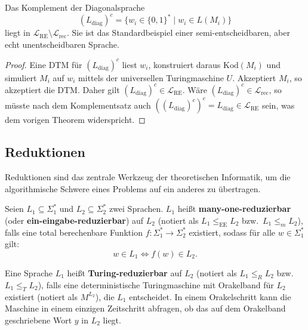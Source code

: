 \begin{theorem}
    Das Komplement der Diagonalsprache
    \[
        (L_{\mathrm{diag}})^c = \{w_i \in \{0, 1\}^* \mid w_i \in L(M_i)\}
    \]
    liegt in $\mathcal{L}_{\mathrm{RE}} \setminus \mathcal{L}_{\mathrm{rec}}$. Sie ist das Standardbeispiel einer semi-entscheidbaren, aber echt unentscheidbaren Sprache.
\end{theorem}

\begin{proof}
    Eine DTM für $(L_{\mathrm{diag}})^c$ liest $w_i$, konstruiert daraus $\mathrm{Kod}(M_i)$ und simuliert $M_i$ auf $w_i$ mittels der universellen Turingmaschine $U$. Akzeptiert $M_i$, so akzeptiert die DTM. Daher gilt $(L_{\mathrm{diag}})^c \in \mathcal{L}_{\mathrm{RE}}$.
    Wäre $(L_{\mathrm{diag}})^c \in \mathcal{L}_{\mathrm{rec}}$, so müsste nach dem Komplementsatz auch $((L_{\mathrm{diag}})^c)^c = L_{\mathrm{diag}} \in \mathcal{L}_{\mathrm{RE}}$ sein, was dem vorigen Theorem widerspricht.
\end{proof}

\subsection{Reduktionen}

Reduktionen sind das zentrale Werkzeug der theoretischen Informatik, um die algorithmische Schwere eines Problems auf ein anderes zu übertragen.

\begin{definition}
    Seien $L_1 \subseteq \Sigma_1^*$ und $L_2 \subseteq \Sigma_2^*$ zwei Sprachen. $L_1$ heißt \textbf{many-one-reduzierbar} (oder \textbf{ein-eingabe-reduzierbar}) auf $L_2$ (notiert als $L_1 \le_{\mathrm{EE}} L_2$ bzw.\ $L_1 \le_m L_2$), falls eine total berechenbare Funktion $f : \Sigma_1^* \to \Sigma_2^*$ existiert, sodass für alle $w \in \Sigma_1^*$ gilt:
    \[
        w \in L_1 \iff f(w) \in L_2.
    \]
\end{definition}

\begin{definition}
    Eine Sprache $L_1$ heißt \textbf{Turing-reduzierbar} auf $L_2$ (notiert als $L_1 \le_R L_2$ bzw.\ $L_1 \le_T L_2$), falls eine deterministische Turingmaschine mit Orakelband für $L_2$ existiert (notiert als $M^{L_2}$), die $L_1$ entscheidet. In einem Orakelschritt kann die Maschine in einem einzigen Zeitschritt abfragen, ob das auf dem Orakelband geschriebene Wort $y$ in $L_2$ liegt.
\end{definition}

